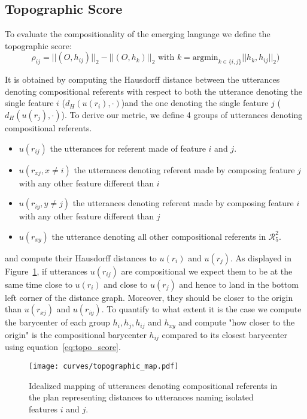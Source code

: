 \label{sup:ref_comp}
\subsection{Topographic Score}
\label{sup:topo_comp}
To evaluate the compositionality of the emerging language we define the topographic score:
\begin{equation}
    \rho_{ij} = ||(O, h_{ij})||_2 - ||(O, h_k)||_2 \text{ with } k = \text{argmin}_{k\in \{i, j\}}||h_k,h_{ij}||_2)
    \label{eq:topo_score}
\end{equation}

It is obtained by computing the Hausdorff distance between the utterances denoting compositional referents with respect to both the utterance denoting the single feature $i$ ($d_H(u(r_i),\cdot)$)and the one denoting the single feature $j$ ($d_H(u(r_j),\cdot)$). To derive our metric, we define 4 groups of utterances denoting compositional referents. 
\begin{itemize}[noitemsep,topsep=0pt]
    \item $u(r_{ij})$ the utterances for referent made of feature $i$ and $j$.
    \item $u(r_{xj}, x\neq i)$ the utterances denoting referent made by composing feature $j$ with any other feature different than $i$
    \item $u(r_{iy}, y\neq j)$ the utterances denoting referent made by composing feature $i$ with any other feature different than $j$
    \item $u(r_{xy})$ the utterance denoting all other compositional referents in $\mathcal{R}^2_5$.
\end{itemize}
%
and compute their Hausdorff distances to $u(r_i)$ and $u(r_j)$.
As displayed in Figure~\ref{fig:topo_distances_intuitive}, if utterances $u(r_{ij})$ are compositional we expect them to be at the same time close to $u(r_{i})$ and close to $u(r_{j})$ and hence to land in the bottom left corner of the distance graph. Moreover, they should be closer to the origin than $u(r_{xj})$ and $u(r_{iy})$. To quantify to what extent it is the case we compute the barycenter of each group $h_i, h_j, h_{ij}$ and $h_{xy}$ and compute "how closer to the origin" is the compositional barycenter $h_{ij}$ compared to its closest barycenter using equation~\ref{eq:topo_score}.
\begin{figure}[h!]
    \centering
    \texttt{[image: curves/topographic\_map.pdf]}
    \caption{Idealized mapping of utterances denoting compositional referents in the plan representing distances to utterances naming isolated features $i$ and $j$.}
    \label{fig:topo_distances_intuitive}
\end{figure}

